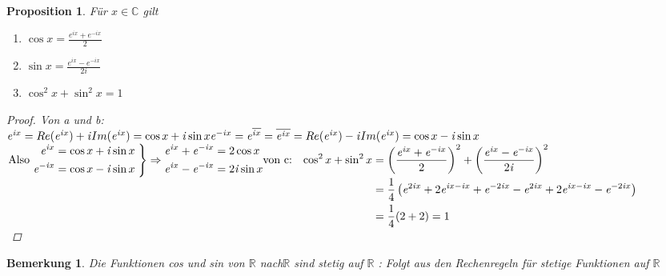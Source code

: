 \documentclass[a4paper,titlepage,oneside]{article}
\def\C{\ensuremath{\mathbb{C}} }
\def\R{\ensuremath{\mathbb{R}} }
\def\im{\ensuremath{\mathit{i}} }
\def\e{\ensuremath{\mathit{e}} }
\def\sp{\hspace{0,1cm}}
\theoremstyle{thmstyle}
\newtheorem{prop}[satz]{Proposition}
\newtheorem{bem}[satz]{Bemerkung}
\theoremstyle{subthmstyle}
\begin{document}
\begin{prop}
Für $x \in \C$ gilt
\begin{enumerate}
\item $ \displaystyle \cos x  = \frac{\e^{\im x} + \e^{-\im x}}{2}$
\item $ \displaystyle \sin x = \frac{\e^{\im x} - \e^{-\im x}}{2\im}$
\item $ \displaystyle \cos^2x + \sin^2 x = 1$
\end{enumerate}
\begin{proof}
Von a und b: \\
$\e^{\im x} = Re(\e^{\im x}) + \im Im(\e^{\im x}) = \cos x + \im \sin x \\
\e^{-\im x} = \e^{\overline{\im x}} = \overline{\e^{\im x}} = Re(\e^{\im x}) - \im Im(\e^{\im x}) = \cos x - \im \sin x $\\
\begin{math}
\displaystyle \left.\text{Also } \begin{aligned} \e^{\im x} &= \cos x + \im \sin x\\ 
\e^{-\im x} &= \cos x - \im \sin x \end{aligned}\sp \right\} \Rightarrow \begin{aligned} \e^{\im x} + \e^{-\im x} &= 2\cos x \\ \e^{\im x} - \e^{-\im x} &= 2\im \sin x \end{aligned} \\
\vphantom{\frac{1}{2}}\text{von c:}\quad \begin{aligned}[t] 
\cos^2 x + \sin^2 x &= \left(\frac{\e^{\im x} + \e^{-\im x}}{2}\right)^2 + \left( \frac{\e^{\im x} - \e^{-\im x}}{2\im}\right)^2 \\
&= \frac{1}{4}\left(\e^{2 \im x} + 2 \e^{\im x - \im x} + \e^{-2\im x} - \e^{2\im x} + 2 \e^{\im x -\im x} - \e^{-2\im x}\right) \\
&= \frac{1}{4}(2+2) = 1\end{aligned}
\end{math}\\
\end{proof}
\end{prop}

\begin{bem}
Die Funktionen cos und sin von \R nach\R sind stetig auf \R:
Folgt aus den Rechenregeln für stetige Funktionen auf \R
\end{bem}
\end{document}
